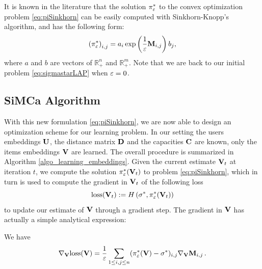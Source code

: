 It is known in the literature \cite{cuturi_sinkhorn_2013} that the solution
$\pi_{\varepsilon}^*$ to the convex optimization problem \eqref{eq:piSinkhorn} can be
easily computed with Sinkhorn-Knopp's algorithm, and has the following form:
\begin{equation}\label{eq:formesinkhorn}
    \left(\pi_{\varepsilon}^* \right)_{i,j} = a_i \exp\left( \frac{1}{\varepsilon} \mathbf{M}_{i,j} \right) b_j,
\end{equation} where $a$ and $b$ are vectors of $\mathbb{R}_+^n$ and $\mathbb{R}_+^m$.
Note that we are back to our initial problem \eqref{eq:sigmastarLAP} when
$\varepsilon=0$.

\subsection*{SiMCa Algorithm}
With this new formulation \eqref{eq:piSinkhorn}, we are now able to design an
optimization scheme for our learning problem. In our setting the users
embeddings $\mathbf{U}$, the distance matrix $\mathbf{D}$ and the capacities $\mathbf{C}$ are known,
only the items embeddings $\mathbf{V}$ are learned. The overall procedure is summarized
in Algorithm \ref{algo_learning_embeddings}. Given the current estimate $\mathbf{V}_t$
at iteration $t$, we compute the solution $\pi^*_{\varepsilon}(\mathbf{V}_t)$ to problem
\eqref{eq:piSinkhorn}, which in turn is used to compute the gradient in $\mathbf{V}_t$
of the following loss
\begin{equation}\label{eq:loss_global}
    \mathrm{loss}(\mathbf{V}_t) := H\left(\sigma^*,\pi^*_{\varepsilon}(\mathbf{V}_t)\right)
\end{equation} to update our estimate of $\mathbf{V}$ through a gradient step. The gradient in $\mathbf{V}$
has actually a simple analytical expression:

\begin{lemma}\label{lemma:gradient} We have
    \begin{equation}
        \label{eq:gradient}
        \nabla_{\mathbf{V}} \mathrm{loss}(\mathbf{V}) = \frac{1}{\varepsilon} \sum_{1 \leq i,j \leq n} (\pi^*_\varepsilon(\mathbf{V}) - \sigma^*)_{i,j} \nabla_{\mathbf{V}} \mathbf{M}_{i,j} \, .
    \end{equation}
\end{lemma}

